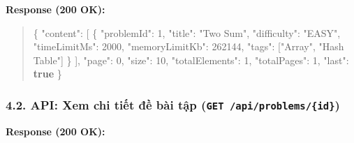 \documentclass[12pt,a4paper]{article}
\renewcommand{\_}{\BreakableUnderscore}
\newenvironment{Shaded}{\vspace{3pt}\begin{quote}}{\end{quote}\vspace{3pt}}
\newcommand{\DataTypeTok}[1]{\textcolor[rgb]{0.56,0.13,0.00}{#1}}
\newcommand{\DecValTok}[1]{\textcolor[rgb]{0.25,0.63,0.44}{#1}}
\newcommand{\FunctionTok}[1]{\textcolor[rgb]{0.02,0.16,0.49}{#1}}
\newcommand{\KeywordTok}[1]{\textcolor[rgb]{0.00,0.44,0.13}{\textbf{#1}}}
\newcommand{\OtherTok}[1]{\textcolor[rgb]{0.00,0.44,0.13}{#1}}
\newcommand{\StringTok}[1]{\textcolor[rgb]{0.25,0.44,0.63}{#1}}
\begin{document}
\textbf{Response (200 OK):}

\begin{Shaded}
\begin{Highlighting}[]
\FunctionTok{\{}
  \DataTypeTok{"content"}\FunctionTok{:} \OtherTok{[}
    \FunctionTok{\{}
      \DataTypeTok{"problemId"}\FunctionTok{:} \DecValTok{1}\FunctionTok{,}
      \DataTypeTok{"title"}\FunctionTok{:} \StringTok{"Two Sum"}\FunctionTok{,}
      \DataTypeTok{"difficulty"}\FunctionTok{:} \StringTok{"EASY"}\FunctionTok{,}
      \DataTypeTok{"timeLimitMs"}\FunctionTok{:} \DecValTok{2000}\FunctionTok{,}
      \DataTypeTok{"memoryLimitKb"}\FunctionTok{:} \DecValTok{262144}\FunctionTok{,}
      \DataTypeTok{"tags"}\FunctionTok{:} \OtherTok{[}\StringTok{"Array"}\OtherTok{,} \StringTok{"Hash Table"}\OtherTok{]}
    \FunctionTok{\}}
  \OtherTok{]}\FunctionTok{,}
  \DataTypeTok{"page"}\FunctionTok{:} \DecValTok{0}\FunctionTok{,}
  \DataTypeTok{"size"}\FunctionTok{:} \DecValTok{10}\FunctionTok{,}
  \DataTypeTok{"totalElements"}\FunctionTok{:} \DecValTok{1}\FunctionTok{,}
  \DataTypeTok{"totalPages"}\FunctionTok{:} \DecValTok{1}\FunctionTok{,}
  \DataTypeTok{"last"}\FunctionTok{:} \KeywordTok{true}
\FunctionTok{\}}
\end{Highlighting}
\end{Shaded}

\subsubsection{\texorpdfstring{4.2. API: Xem chi tiết đề bài tập (\texttt{GET\ /api/problems/\{id\}})}{4.2. API: Xem chi tiết đề bài tập (GET /api/problems/\{id\})}}

\textbf{Response (200 OK):}
\end{document}
